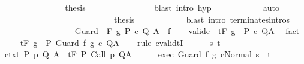 \begin{isabellebody}
\ \ \ \ \ \ \ \ \ \ \ \ \isamarkupfalse%
\ \isamarkupfalse%
\ {\isacharquery}thesis\isanewline
\ \ \ \ \ \ \ \ \ \ \ \ \ \ \isamarkupfalse%
\ {\isacharparenleft}blast\ intro{\isacharcolon}\ hyp{\isacharparenright}\isanewline
\ \ \ \ \ \ \ \ \ \ \isamarkupfalse%
\ auto\isanewline
\ \ \ \ \ \ \ \ \isacommand{{\isacharbraceright}}\isamarkupfalse%
\isanewline
\ \ \ \ \ \ \ \ \isamarkupfalse%
\isanewline
\ \ \ \ \ \ \ \ \isamarkupfalse%
\ {\isacharquery}thesis\isanewline
\ \ \ \ \ \ \ \ \ \ \isamarkupfalse%
\ {\isacharparenleft}blast\ intro{\isacharcolon}\ terminates{\isachardot}intros{\isacharparenright}\isanewline
\ \ \ \ \ \ \isamarkupfalse%
\isanewline
\ \ \ \ \isamarkupfalse%
\isanewline
\ \ \isamarkupfalse%
\isanewline
{}\isamarkupfalse%
\isanewline
\ \ \isamarkupfalse%
\ {\isacharparenleft}Guard\ {\isasymTheta}\ F\ g\ P\ c\ Q\ A\ \ f{\isacharparenright}\isanewline
\ \ \isamarkupfalse%
\ valid{\isacharunderscore}c{\isacharcolon}\ {\isachardoublequoteopen}{\isasymGamma}{\isacharcomma}{\isasymTheta}\ {\isasymTurnstile}\isactrlsub t\isactrlbsub {\isacharslash}F\isactrlesub \ {\isacharparenleft}g\ {\isasyminter}\ P{\isacharparenright}\ c\ Q{\isacharcomma}A{\isachardoublequoteclose}\ \isamarkupfalse%
\ fact\isanewline
\ \ \isamarkupfalse%
\ {\isachardoublequoteopen}{\isasymGamma}{\isacharcomma}{\isasymTheta}\ {\isasymTurnstile}\isactrlsub t\isactrlbsub {\isacharslash}F\isactrlesub \ {\isacharparenleft}g\ {\isasyminter}\ P{\isacharparenright}\ Guard\ f\ g\ c\ Q{\isacharcomma}A{\isachardoublequoteclose}\isanewline
\ \ \isamarkupfalse%
\ {\isacharparenleft}rule\ cvalidtI{\isacharparenright}\isanewline
\ \ \ \ \isamarkupfalse%
\ s\ t\isanewline
\ \ \ \ \isamarkupfalse%
\ ctxt{\isacharcolon}\ {\isachardoublequoteopen}{\isasymforall}{\isacharparenleft}P{\isacharcomma}\ p{\isacharcomma}\ Q{\isacharcomma}\ A{\isacharparenright}{\isasymin}{\isasymTheta}{\isachardot}\ {\isasymGamma}\ {\isasymTurnstile}\isactrlsub t\isactrlbsub {\isacharslash}F\isactrlesub \ P\ {\isacharparenleft}Call\ p{\isacharparenright}\ Q{\isacharcomma}A{\isachardoublequoteclose}\isanewline
\ \ \ \ \isamarkupfalse%
\ exec{\isacharcolon}\ {\isachardoublequoteopen}{\isasymGamma}{\isasymturnstile}{\isasymlangle}Guard\ f\ g\ c{\isacharcomma}Normal\ s{\isasymrangle}\ {\isasymRightarrow}\ t{\isachardoublequoteclose}\isanewline

\end{isabellebody}
